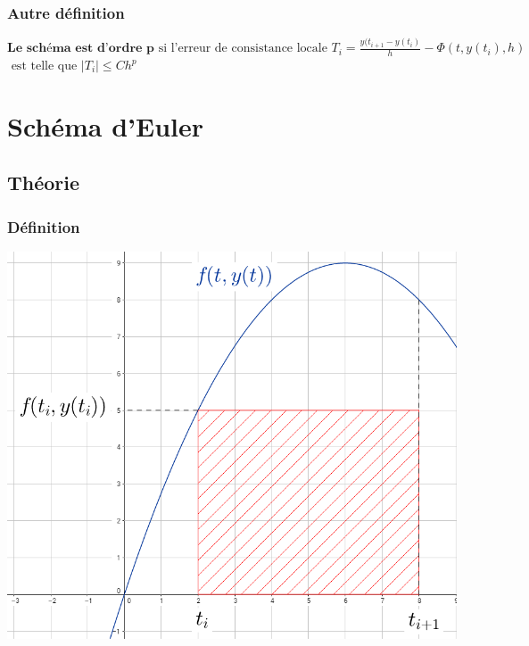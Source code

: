 \documentclass[a4paper,10pt]{report}
\begin{document}
\subsubsection{Autre définition}
$\textbf{Le schéma est d'ordre p} \text{ si l'erreur de consistance locale } T_i = \frac{y(t_{i+1}-y(t_i)}{h}- \Phi(t,y(t_i),h)$\\
$\text{ est telle que } |T_i|\leq Ch^p$

\newpage
\section{Schéma d'Euler}
\subsection{Théorie}
\subsubsection{Définition}
\begin{minipage}{.41\linewidth}
\includegraphics[width=\textwidth]{rectangle.png}
\end{minipage} \hfill
\begin{minipage}{.05\linewidth}
\end{minipage} \hfill
\end{document}
